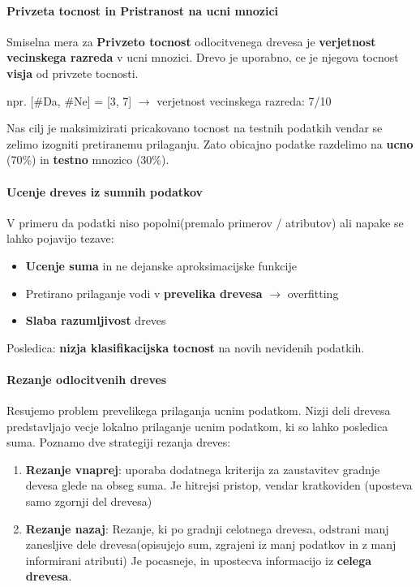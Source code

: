 \documentclass{article}
\begin{document}
\begin{multicols}{2}
	\paragraph{Privzeta tocnost in Pristranost na ucni mnozici}

	Smiselna mera za \textbf{Privzeto tocnost} odlocitvenega drevesa je \textbf{verjetnost vecinskega razreda} v
	ucni mnozici. Drevo je uporabno, ce je njegova tocnost \textbf{visja} od privzete tocnosti.

	npr. [\#Da, \#Ne] = [3, 7] $\rightarrow$ verjetnost vecinskega razreda: 7/10


	Nas cilj je maksimizirati pricakovano tocnost na testnih podatkih vendar se zelimo izogniti pretiranemu prilaganju. Zato obicajno podatke
	razdelimo na \textbf{ucno} (70\%) in \textbf{testno} mnozico (30\%).

	\paragraph{Ucenje dreves iz sumnih podatkov}
	V primeru da podatki niso popolni(premalo primerov / atributov) ali napake
	se lahko pojavijo tezave:
	\begin{itemize}
		\item \textbf{Ucenje suma} in ne dejanske aproksimacijske funkcije
		\item Pretirano prilaganje vodi v \textbf{prevelika drevesa} $\rightarrow$ overfitting
		\item \textbf{Slaba razumljivost} dreves
	\end{itemize}
	Posledica: \textbf{nizja klasifikacijska tocnost} na novih nevidenih podatkih.

	\paragraph{Rezanje odlocitvenih dreves}
	Resujemo problem prevelikega prilaganja ucnim podatkom.
	Nizji deli drevesa predstavljajo vecje lokalno prilaganje ucnim podatkom, ki so lahko posledica suma.
	Poznamo dve strategiji rezanja dreves:
	\begin{enumerate}
		\item \textbf{Rezanje vnaprej}: uporaba dodatnega kriterija za zaustavitev
		      gradnje devesa glede na obseg suma. Je hitrejsi pristop, vendar kratkoviden (uposteva samo zgornji del drevesa)
		\item \textbf{Rezanje nazaj}: Rezanje, ki po gradnji celotnega drevesa, odstrani manj zanesljive
		      dele drevesa(opisujejo sum, zgrajeni iz manj podatkov in z manj informirani atributi)
		      Je pocasneje, in upostecva informacijo iz \textbf{celega drevesa}.
	\end{enumerate}


\end{multicols}
\end{document}

